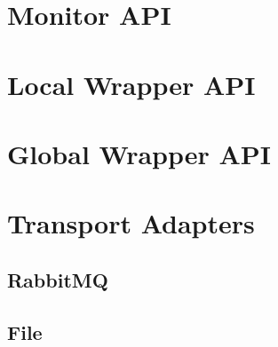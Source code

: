 \documentclass[paper=letter]{scrreport}
\begin{document}


\chapter{Monitor API}


\chapter{Local Wrapper API}


\chapter{Global Wrapper API}


\chapter{Transport Adapters}


\section{RabbitMQ}



\section{File}


\end{document}
